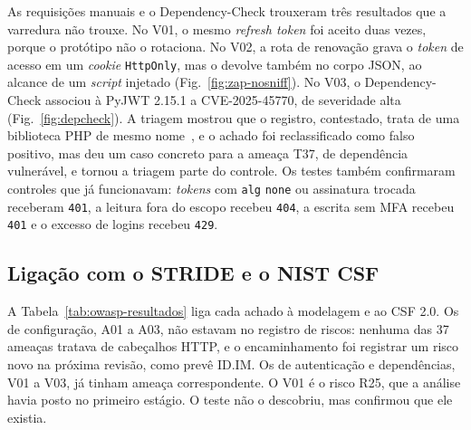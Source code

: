 \documentclass[conference]{IEEEtran}
\begin{document}
As requisições manuais e o Dependency-Check trouxeram três resultados que a varredura não trouxe. No V01, o mesmo \textit{refresh token} foi aceito duas vezes, porque o protótipo não o rotaciona. No V02, a rota de renovação grava o \textit{token} de acesso em um \textit{cookie} \texttt{HttpOnly}, mas o devolve também no corpo JSON, ao alcance de um \textit{script} injetado (Fig.~\ref{fig:zap-nosniff}). No V03, o Dependency-Check associou à PyJWT 2.15.1 a CVE-2025-45770, de severidade alta (Fig.~\ref{fig:depcheck}). A triagem mostrou que o registro, contestado, trata de uma biblioteca PHP de mesmo nome~\cite{nvdcve202545770}, e o achado foi reclassificado como falso positivo, mas deu um caso concreto para a ameaça T37, de dependência vulnerável, e tornou a triagem parte do controle. Os testes também confirmaram controles que já funcionavam: \textit{tokens} com \texttt{alg} \texttt{none} ou assinatura trocada receberam \texttt{401}, a leitura fora do escopo recebeu \texttt{404}, a escrita sem MFA recebeu \texttt{401} e o excesso de logins recebeu \texttt{429}.

\subsection{Ligação com o STRIDE e o NIST CSF}
\label{subsec:owasp-ligacao}

A Tabela~\ref{tab:owasp-resultados} liga cada achado à modelagem e ao CSF 2.0. Os de configuração, A01 a A03, não estavam no registro de riscos: nenhuma das 37 ameaças tratava de cabeçalhos HTTP, e o encaminhamento foi registrar um risco novo na próxima revisão, como prevê ID.IM. Os de autenticação e dependências, V01 a V03, já tinham ameaça correspondente. O V01 é o risco R25, que a análise havia posto no primeiro estágio. O teste não o descobriu, mas confirmou que ele existia.
\end{document}
